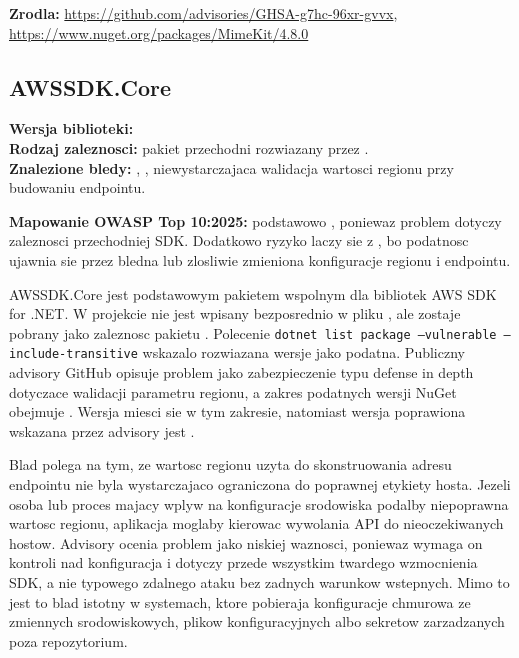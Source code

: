\documentclass[12pt,a4paper]{article}
\begin{document}
\textbf{Zrodla:} \url{https://github.com/advisories/GHSA-g7hc-96xr-gvvx}, \url{https://www.nuget.org/packages/MimeKit/4.8.0}

\clearpage
\subsection{AWSSDK.Core}

\textbf{Wersja biblioteki:} \\
\textbf{Rodzaj zaleznosci:} pakiet przechodni rozwiazany przez .\\
\textbf{Znalezione bledy:} , , niewystarczajaca walidacja wartosci regionu przy budowaniu endpointu.

\textbf{Mapowanie OWASP Top 10:2025:} podstawowo , poniewaz problem dotyczy zaleznosci przechodniej SDK. Dodatkowo ryzyko laczy sie z , bo podatnosc ujawnia sie przez bledna lub zlosliwie zmieniona konfiguracje regionu i endpointu.

AWSSDK.Core jest podstawowym pakietem wspolnym dla bibliotek AWS SDK for .NET. W projekcie nie jest wpisany bezposrednio w pliku , ale zostaje pobrany jako zaleznosc pakietu . Polecenie \texttt{dotnet list package --vulnerable --include-transitive} wskazalo rozwiazana wersje  jako podatna. Publiczny advisory GitHub opisuje problem jako zabezpieczenie typu defense in depth dotyczace walidacji parametru regionu, a zakres podatnych wersji NuGet obejmuje . Wersja  miesci sie w tym zakresie, natomiast wersja poprawiona wskazana przez advisory jest .

Blad polega na tym, ze wartosc regionu uzyta do skonstruowania adresu endpointu nie byla wystarczajaco ograniczona do poprawnej etykiety hosta. Jezeli osoba lub proces majacy wplyw na konfiguracje srodowiska podalby niepoprawna wartosc regionu, aplikacja moglaby kierowac wywolania API do nieoczekiwanych hostow. Advisory ocenia problem jako niskiej waznosci, poniewaz wymaga on kontroli nad konfiguracja i dotyczy przede wszystkim twardego wzmocnienia SDK, a nie typowego zdalnego ataku bez zadnych warunkow wstepnych. Mimo to jest to blad istotny w systemach, ktore pobieraja konfiguracje chmurowa ze zmiennych srodowiskowych, plikow konfiguracyjnych albo sekretow zarzadzanych poza repozytorium.
\end{document}
